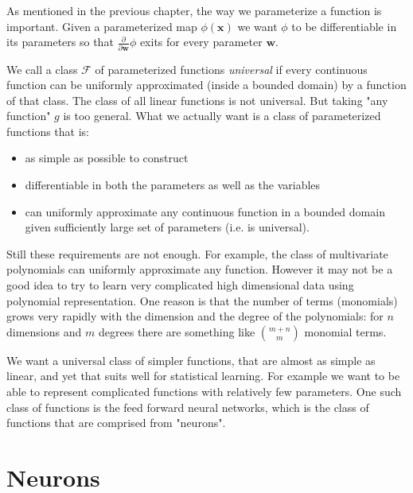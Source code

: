 \documentclass[11pt, a4paper]{report}
\theoremstyle{plain}
\theoremstyle{definition}
\theoremstyle{remark}
\newcommand{\R}{\mathbb{R}}
\newcommand{\x}{\mathbf{x}}
\newcommand{\w}{\mathbf{w}}
\begin{document}
As mentioned in the previous chapter,
the way we parameterize a function is important. Given a parameterized
map $\phi (\x)$ we want $\phi$ to be differentiable in its parameters so that
$\frac{\partial}{\partial \w} \phi$ exits for every parameter $\w$. 



We call a class $\mathcal{F}$ of parameterized functions \emph{universal} if
every continuous function can be uniformly approximated (inside a bounded
domain) by a function of that class. The class of all linear functions is not
universal. But taking "any function" $g$ is too general. What we actually want
is a class of parameterized functions that is:
\begin{itemize}
\item{} as simple as possible to construct
\item{} differentiable in both the parameters as well as the variables
\item{} can uniformly approximate any continuous function in a bounded domain
given sufficiently large set of
parameters (i.e. is universal).
\end{itemize}

Still these requirements are not enough. For example, the class of multivariate
polynomials can uniformly approximate any function. However it may not be a good
idea to try to learn very complicated high dimensional data using polynomial
representation. One reason is that the number of terms (monomials) grows very
rapidly with the dimension and the degree of the polynomials: for $n$ dimensions
and $m$ degrees there are something like $\binom{m + n}{m}$ monomial terms.

We want a universal class of simpler functions, that are almost as simple as
linear, and yet that suits well for statistical learning. For example we want to
be able to represent complicated functions with relatively few parameters. One
such class of functions is the feed forward neural networks, which is the class
of functions that are comprised from "neurons".

\section{Neurons}
\end{document}
